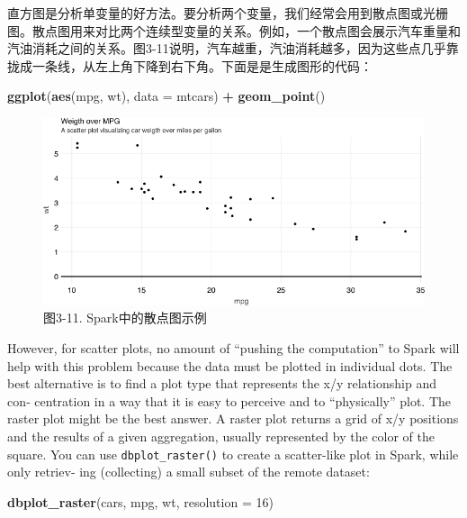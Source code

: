 \documentclass[
]{article}
\newenvironment{Shaded}{\begin{snugshade}}{\end{snugshade}}
\newcommand{\DataTypeTok}[1]{\textcolor[rgb]{0.13,0.29,0.53}{#1}}
\newcommand{\DecValTok}[1]{\textcolor[rgb]{0.00,0.00,0.81}{#1}}
\newcommand{\KeywordTok}[1]{\textcolor[rgb]{0.13,0.29,0.53}{\textbf{#1}}}
\newcommand{\NormalTok}[1]{#1}
\newcommand{\OperatorTok}[1]{\textcolor[rgb]{0.81,0.36,0.00}{\textbf{#1}}}
\newcommand{\StringTok}[1]{\textcolor[rgb]{0.31,0.60,0.02}{#1}}
\begin{document}
直方图是分析单变量的好方法。要分析两个变量，我们经常会用到散点图或光栅图。散点图用来对比两个连续型变量的关系。例如，一个散点图会展示汽车重量和汽油消耗之间的关系。图3-11说明，汽车越重，汽油消耗越多，因为这些点几乎靠拢成一条线，从左上角下降到右下角。下面是是生成图形的代码：

\begin{Shaded}
\begin{Highlighting}[]
\KeywordTok{ggplot}\NormalTok{(}\KeywordTok{aes}\NormalTok{(mpg, wt), }\DataTypeTok{data =}\NormalTok{ mtcars) }\OperatorTok{+}\StringTok{ }\KeywordTok{geom_point}\NormalTok{()}
\end{Highlighting}
\end{Shaded}

\begin{figure}
\centering
\includegraphics{figures/3_11.png}
\caption{图3-11. Spark中的散点图示例}
\end{figure}

However, for scatter plots, no amount of ``pushing the computation'' to
Spark will help with this problem because the data must be plotted in
individual dots. The best alternative is to find a plot type that
represents the x/y relationship and con‐ centration in a way that it is
easy to perceive and to ``physically'' plot. The raster plot might be
the best answer. A raster plot returns a grid of x/y positions and the
results of a given aggregation, usually represented by the color of the
square. You can use \texttt{dbplot\_raster()} to create a scatter-like
plot in Spark, while only retriev‐ ing (collecting) a small subset of
the remote dataset:

\begin{Shaded}
\begin{Highlighting}[]
\KeywordTok{dbplot_raster}\NormalTok{(cars, mpg, wt, }\DataTypeTok{resolution =} \DecValTok{16}\NormalTok{)}
\end{Highlighting}
\end{Shaded}
\end{document}
